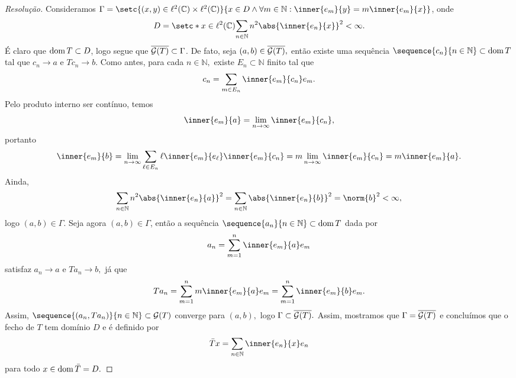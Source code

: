 \begin{proof}[Resolução]
  Consideramos \(\Gamma = \setc{(x,y) \in \ell^2(\mathbb{C}) \times \ell^2(\mathbb{C})}{x \in D \land \forall m \in \mathbb{N}: \inner{e_m}{y} = m \inner{e_m}{x}}\), onde
  \begin{equation*}
    D = \setc*{x \in \ell^2(\mathbb{C})}{\sum_{n \in \mathbb{N}} n^2 \abs{\inner{e_n}{x}}^2 < \infty}.
  \end{equation*}
  É claro que \(\operatorname{dom}{T} \subset D\), logo segue que \(\overline{\mathcal{G}(T)} \subset \Gamma\). De fato, seja \((a,b) \in \overline{\mathcal{G}(T)},\) então existe uma sequência \(\sequence{c_n}{n\in\mathbb{N}} \subset \dom{T}\) tal que \(c_n \to a\) e \(Tc_n \to b.\) Como antes, para cada \(n \in \mathbb{N},\) existe \(E_n \subset \mathbb{N}\) finito tal que
  \begin{equation*}
    c_n = \sum_{m \in E_n}\inner{e_m}{c_n}e_m.
  \end{equation*}
  Pelo produto interno ser contínuo, temos
  \begin{equation*}
    \inner{e_m}{a} = \lim_{n\to\infty} \inner{e_m}{c_n},
  \end{equation*}
  portanto
  \begin{equation*}
    \inner{e_m}{b} = \lim_{n\to\infty} \sum_{\ell \in E_n} \ell\inner{e_m}{e_\ell}\inner{e_m}{c_n} = m \lim_{n\to\infty} \inner{e_m}{c_n} = m \inner{e_m}{a}.
  \end{equation*}
  Ainda,
  \begin{equation*}
    \sum_{n \in \mathbb{N}} n^2 \abs{\inner{e_n}{a}}^2 = \sum_{n \in \mathbb{N}} \abs{\inner{e_n}{b}}^2 = \norm{b}^2 < \infty,
  \end{equation*}
  logo \((a,b) \in \Gamma.\) Seja agora \((a,b) \in \Gamma\), então a sequência \(\sequence{a_n}{n \in \mathbb{N}} \subset \dom{T}\) dada por
  \begin{equation*}
    a_n = \sum_{m = 1}^n \inner{e_m}{a}e_m
  \end{equation*}
  satisfaz \(a_n \to a\) e \(Ta_n \to b,\) já que
  \begin{equation*}
    Ta_n = \sum_{m = 1}^n m\inner{e_m}{a}e_m = \sum_{m = 1}^n \inner{e_m}{b}e_m.
  \end{equation*}
  Assim, \(\sequence{(a_n, Ta_n)}{n\in\mathbb{N}} \subset \graph{T}\) converge para \((a,b),\) logo \(\Gamma \subset \overline{\mathcal{G}(T)}.\) Assim, mostramos que \(\Gamma = \overline{\mathcal{G}(T)}\) e concluímos que o fecho de \(T\) tem domínio \(D\) e é definido por
  \begin{equation*}
    \bar{T}x = \sum_{n \in \mathbb{N}}\inner{e_n}{x}e_n
  \end{equation*}
  para todo \(x \in \operatorname{dom}{\bar{T}} = D.\)
\end{proof}

